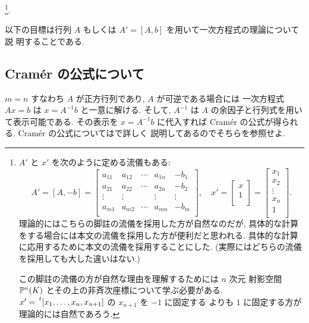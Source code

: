 \documentclass[12pt,twoside]{jarticle}
\begin{document}
\footnote{$A'$ と $x'$ を次のように定める流儀もある:
  \begin{equation*}
    A' = [A,-b] =
    \begin{bmatrix}
      a_{11} & a_{12} & \cdots & a_{1n} & -b_1 \\
      a_{21} & a_{22} & \cdots & a_{2n} & -b_2 \\
      \vdots & \vdots &        & \vdots & \vdots \\
      a_{m1} & a_{m2} & \cdots & a_{mn} & -b_m \\
    \end{bmatrix},
    \quad
    x' = 
    \begin{bmatrix}
      x \\
      1 \\
    \end{bmatrix}
    =
    \begin{bmatrix}
      x_1 \\
      x_2 \\
      \vdots \\
      x_n \\
      1 \\
    \end{bmatrix}.
  \end{equation*}
  理論的にはこちらの脚註の流儀を採用した方が自然なのだが, 
  具体的な計算をする場合には本文の流儀を採用した方が便利だと思われる.
  具体的な計算に応用するために本文の流儀を採用することにした.
  (実際にはどちらの流儀を採用しても大した違いはない.)

  この脚註の流儀の方が自然な理由を理解するためには $n$ 次元
  射影空間 ${\mathbb P}^n(K)$ とその上の非斉次座標について学ぶ必要がある.
  $x'=\tp{[x_1,\ldots,x_n,x_{n+1}]}$ の $x_{n+1}$ を $-1$ に固定する
  よりも $1$ に固定する方が理論的には自然であろう.
  }.

以下の目標は行列 $A$ もしくは $A'=[A,b]$ を用いて一次方程式の理論について説
明することである.


\subsection{Cram\'er の公式について}

$m=n$ すなわち $A$ が正方行列であり, $A$ が可逆である場合には
一次方程式 $Ax=b$ は $x = A^{-1}b$ と一意に解ける.
そして, $A^{-1}$ は $A$ の余因子と行列式を用いて表示可能である.
その表示を $x=A^{-1}b$ に代入すれば Cram\'er の公式が得られる.
Cram\'er の公式についてはで詳しく
説明してあるのでそちらを参照せよ.
\end{document}
